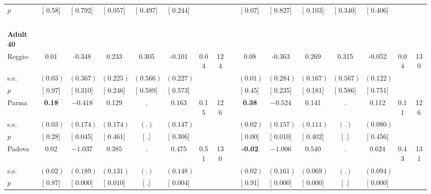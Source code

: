 \begin{longtable}{L{8em} c c c c c c c p{1em} c c c c c c c}
\quad \quad \quad \quad $ p$ & [     0.58] & [    0.792] & [    0.057] & [    0.497] & [    0.244] & & & & [     0.07] & [    0.827] & [    0.103] & [    0.340] & [    0.406] & &  \\[1em]
~\\[1em]
\quad \quad \textbf{Adult 40} & & & & & & & & & & & & & & & \\* 
\quad \quad \quad Reggio& 0.01 &    -0.348 &     0.233 &     0.305 &    -0.101 &      0.04 &       124 & & 0.08 &    -0.363 &     0.269 &     0.315 &    -0.052 &      0.04 &       130  \\*
\quad \quad \quad \quad s.e.& $ (     0.03)$ & $ (    0.367)$ & $ (    0.225)$ & $ (    0.566)$ & $ (    0.227)$ & & & & $ (     0.01)$ & $ (    0.284)$ & $ (    0.167)$ & $ (    0.567)$ & $ (    0.122)$ & &  \\*
\quad \quad \quad \quad $ p$ & [     0.97] & [    0.310] & [    0.246] & [    0.589] & [    0.573] & & & & [     0.45] & [    0.235] & [    0.181] & [    0.586] & [    0.751] & &  \\[1em]
\quad \quad \quad Parma& \textbf{     0.18} & $ \mathbf{   -0.418}$ &     0.129 &         . &     0.163 &      0.15 &       126 & & \textbf{     0.38} & $ \mathbf{   -0.524}$ &     0.141 &         . &     0.112 &      0.11 &       126  \\*
\quad \quad \quad \quad s.e.& $ (     0.03)$ & $ (    0.174)$ & $ (    0.174)$ & $ (        .)$ & $ (    0.147)$ & & & & $ (     0.02)$ & $ (    0.157)$ & $ (    0.111)$ & $ (        .)$ & $ (    0.080)$ & &  \\*
\quad \quad \quad \quad $ p$ & [     0.28] & [    0.045] & [    0.461] & [        .] & [    0.306] & & & & [     0.00] & [    0.010] & [    0.402] & [        .] & [    0.456] & &  \\[1em]
\quad \quad \quad Padova& 0.02 & $ \mathbf{   -1.037}$ & $ \mathbf{    0.385}$ &         . & $ \mathbf{    0.475}$ &      0.51 &       130 & & \textbf{    -0.02} & $ \mathbf{   -1.006}$ & $ \mathbf{    0.540}$ &         . & $ \mathbf{    0.624}$ &      0.43 &       131  \\*
\quad \quad \quad \quad s.e.& $ (     0.02)$ & $ (    0.189)$ & $ (    0.131)$ & $ (        .)$ & $ (    0.148)$ & & & & $ (     0.02)$ & $ (    0.161)$ & $ (    0.069)$ & $ (        .)$ & $ (    0.094)$ & &  \\*
\quad \quad \quad \quad $ p$ & [     0.87] & [    0.000] & [    0.010] & [        .] & [    0.004] & & & & [     0.91] & [    0.000] & [    0.000] & [        .] & [    0.000] & &  \\[1em]

\end{longtable}

